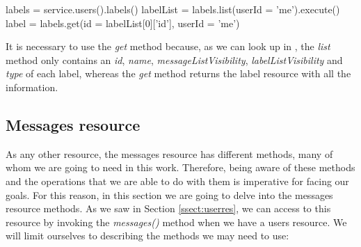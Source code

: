 \begin{python}
	labels = service.users().labels()
	labelList = labels.list(userId = 'me').execute()
	label = labels.get(id = labelList[0]['id'], userId = 'me')
\end{python}

It is necessary to use the \textit{get} method because, as we can look up in \cite[/v1/reference/users/labels/list]{gmailAPI}, the \textit{list} method only contains an \textit{id}, \textit{name}, \textit{messageListVisibility}, \textit{labelListVisibility} and \textit{type} of each label, whereas the \textit{get} method returns the label resource with all the information.

\subsection{Messages resource}\label{ssect:msgres}
As any other resource, the messages resource has different methods, many of whom we are going to need in this work. Therefore, being aware of these methods and the operations that we are able to do with them is imperative for facing our goals. For this reason, in this section we are going to delve into the messages resource methods. As we saw in Section \ref{ssect:userres}, we can access to this resource by invoking the \textit{messages()} method when we have a users resource. We will limit ourselves to describing the methods we may need to use:

